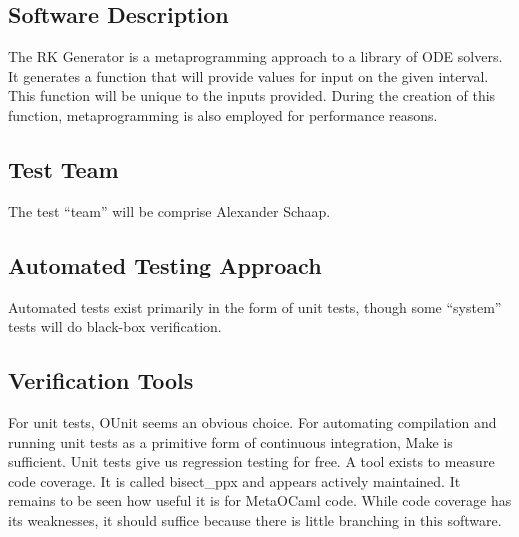 \documentclass[12pt, titlepage]{article}
\begin{document}
\subsection{Software Description}

The RK Generator is a metaprogramming approach to a library of ODE solvers.
It generates a function that will provide values for input on the given 
interval. This function will be unique to the inputs provided. During the 
creation of this function, metaprogramming is also employed for performance 
reasons.

\subsection{Test Team}

The test ``team'' will be comprise Alexander Schaap.
\subsection{Automated Testing Approach}

Automated tests exist primarily in the form of unit tests, though some 
``system'' tests will do black-box verification.

\subsection{Verification Tools}

For unit tests, OUnit seems an obvious choice. For automating compilation and 
running unit tests as a primitive form of continuous integration, Make is 
sufficient. Unit tests give us regression testing for free. A tool exists to 
measure code coverage. It is called bisect\_ppx and appears actively 
maintained. It remains to be seen how useful it is for MetaOCaml code. While 
code coverage has its weaknesses, it should suffice because there is little 
branching in this software.

		
\end{document}
